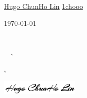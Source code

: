 \documentclass[12pt]{letter}
\begin{document}

\begin{center}
{\fontsize{28}{0}\selectfont\scshape \myname}

\href{mailto:\myemail}{\faEnvelope\enspace \myemail}\hfill
\href{https://www.linkedin.com/in/1chooo/}{\faLinkedinIn\enspace Hugo ChunHo Lin}\hfill
\href{tel:\myphone}{\faPhone\enspace \myphone}\hfill
\href{https://github.com/1chooo}{\faGithub\enspace 1chooo}
\end{center}


\vspace{0.2in}

\today\\

\vspace{-0.1in}\recipient\\
\company\\

\vspace{-0.1in}\greeting\ \recipient\ \commited,\\

\vspace{-0.1in}\setlength\parindent{24pt}
\noindent

\vspace{0.1in}
\vfill

\begin{flushright}
\closer,

\vspace{-0.1in}\includegraphics[width=1.5in]{sig.png}\vspace{-0.1in}

\myname\\
\mytitle
\end{flushright}

% 
\end{document}
